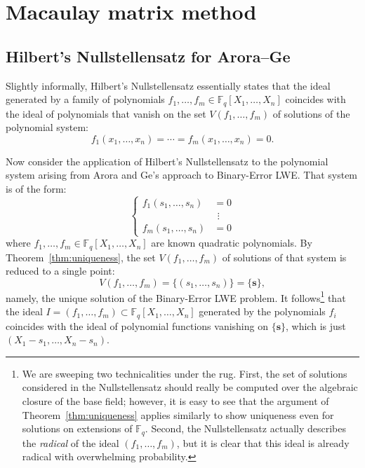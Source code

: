 \documentclass[a4paper]{article}
\theoremstyle{definition}
\theoremstyle{remark}
\renewcommand{\vec}{\mathbf}
\newcommand{\F}{\mathbb{F}}
\begin{document}
\iffalse
\section{Macaulay matrix method}

\subsection{Hilbert's Nullstellensatz for Arora--Ge}

Slightly informally, Hilbert's Nullstellensatz essentially states that
the ideal generated by a family of polynomials
$f_1,\dots,f_m\in\F_q[X_1,\dots,X_n]$ coincides with the ideal of
polynomials that vanish on the set $V(f_1,\dots,f_m)$ of solutions of the
polynomial system:
\[ f_1(x_1,\dots,x_n) = \cdots = f_m(x_1,\dots,x_n) = 0. \]

Now consider the application of Hilbert's Nullstellensatz to the
polynomial system arising from Arora and Ge's approach to
Binary-Error LWE. That system is of the form:
\[ \left\{
   \begin{aligned}
   f_1(s_1,\dots,s_n) &= 0 \\
   &\ \,\vdots \\
   f_m(s_1,\dots,s_n) &= 0
   \end{aligned}
   \right.
\]
where $f_1,\dots,f_m\in\F_q[X_1,\dots,X_n]$ are known quadratic
polynomials. By Theorem~\ref{thm:uniqueness}, the set $V(f_1,\dots,f_m)$
of solutions of that system is reduced to a single point:
\[ V(f_1,\dots,f_m) = \big\{ (s_1,\dots,s_n) \big\} = \big\{\vec s\big\},
\]
namely, the unique solution of the Binary-Error LWE problem. It
follows\footnote{We are sweeping two technicalities under the rug. First,
the set of solutions considered in the Nullstellensatz should really be
computed over the algebraic closure of the base field; however, it is
easy to see that the argument of Theorem~\ref{thm:uniqueness} applies
similarly to show uniqueness even for solutions on extensions of $\F_q$.
Second, the Nullstellensatz actually describes the \emph{radical} of the
ideal $(f_1,\dots,f_m)$, but it is clear that this ideal is already
radical with overwhelming probability.}
that the ideal $I = (f_1,\dots,f_m)\subset \F_q[X_1,\dots,X_n]$ generated
by the polynomials $f_i$ coincides with the ideal of polynomial functions
vanishing on $\big\{\vec s\big\}$, which is just
$(X_1-s_1,\dots,X_n-s_n)$.
 
\end{document}
